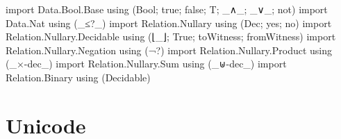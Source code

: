 \begin{fence}
\begin{code}
import Data.Bool.Base using (Bool; true; false; T; _∧_; _∨_; not)
import Data.Nat using (_≤?_)
import Relation.Nullary using (Dec; yes; no)
import Relation.Nullary.Decidable using (⌊_⌋; True; toWitness; fromWitness)
import Relation.Nullary.Negation using (¬?)
import Relation.Nullary.Product using (_×-dec_)
import Relation.Nullary.Sum using (_⊎-dec_)
import Relation.Binary using (Decidable)
\end{code}
\end{fence}

\hypertarget{unicode}{%
\section{Unicode}\label{unicode}}


